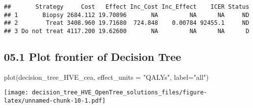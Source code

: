 \documentclass[
]{article}
\newenvironment{Shaded}{\begin{snugshade}}{\end{snugshade}}
\newcommand{\AttributeTok}[1]{\textcolor[rgb]{0.77,0.63,0.00}{#1}}
\newcommand{\CommentTok}[1]{\textcolor[rgb]{0.56,0.35,0.01}{\textit{#1}}}
\newcommand{\FunctionTok}[1]{\textcolor[rgb]{0.00,0.00,0.00}{#1}}
\newcommand{\NormalTok}[1]{#1}
\newcommand{\OtherTok}[1]{\textcolor[rgb]{0.56,0.35,0.01}{#1}}
\newcommand{\SpecialCharTok}[1]{\textcolor[rgb]{0.00,0.00,0.00}{#1}}
\newcommand{\StringTok}[1]{\textcolor[rgb]{0.31,0.60,0.02}{#1}}
\begin{document}
\begin{Shaded}
\end{Shaded}

\begin{verbatim}
##       Strategy     Cost   Effect Inc_Cost Inc_Effect    ICER Status
## 1       Biopsy 2684.112 19.70896       NA         NA      NA     ND
## 2        Treat 3408.960 19.71680  724.848    0.00784 92455.1     ND
## 3 Do not treat 4117.200 19.62600       NA         NA      NA      D
\end{verbatim}

\hypertarget{plot-frontier-of-decision-tree}{%
\subsection{05.1 Plot frontier of Decision
Tree}\label{plot-frontier-of-decision-tree}}

\begin{Shaded}
\begin{Highlighting}[]
\FunctionTok{plot}\NormalTok{(decision\_tree\_HVE\_cea, }\AttributeTok{effect\_units =} \StringTok{"QALYs"}\NormalTok{, }\AttributeTok{label=}\StringTok{"all"}\NormalTok{)}
\end{Highlighting}
\end{Shaded}

\texttt{[image: decision\_tree\_HVE\_OpenTree\_solutions\_files/figure-latex/unnamed-chunk-10-1.pdf]}
\end{document}
